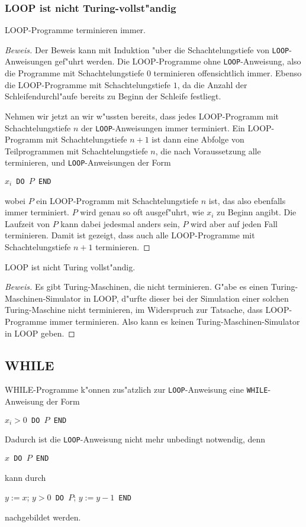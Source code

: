 \subsubsection{LOOP ist nicht Turing-vollst"andig}
\begin{satz}
LOOP-Programme terminieren immer.
\end{satz}

\begin{proof}[Beweis]
Der Beweis kann mit Induktion "uber die Schachtelungstiefe
von {\tt LOOP}-Anweisungen gef"uhrt werden. Die LOOP-Programme
ohne {\tt LOOP}-Anweisung, also die Programme mit Schachtelungstiefe
$0$ terminieren offensichtlich immer. Ebenso die LOOP-Programme
mit Schachtelungstiefe $1$, da die Anzahl der Schleifendurchl"aufe
bereits zu Beginn der Schleife festliegt.

Nehmen wir jetzt an wir w"ussten bereits, dass jedes LOOP-Programm mit
Schachtelungstiefe $n$ der {\tt LOOP}-Anweisungen immer terminiert.
Ein LOOP-Programm mit Schachtelungstiefe $n+1$ ist dann eine
Abfolge von Teilprogrammen mit Schachtelungstiefe $n$, die nach
Voraussetzung alle terminieren, und {\tt LOOP}-Anweisungen der
Form
\begin{algorithmic}
$x_i${\tt\ DO }$P${\tt\ END}
\end{algorithmic}
wobei $P$ ein LOOP-Programm mit Schachtelungstiefe $n$ ist, das also
ebenfalls immer terminiert. $P$ wird genau so oft ausgef"uhrt, wie
$x_i$ zu Beginn angibt. Die Laufzeit von $P$ kann dabei jedesmal
anders sein, $P$ wird aber auf jeden Fall terminieren. Damit ist
gezeigt, dass auch alle LOOP-Programme mit Schachtelungstiefe $n+1$
terminieren.
\end{proof}

\begin{satz}
LOOP ist nicht Turing vollst"andig.
\end{satz}

\begin{proof}[Beweis]
Es gibt Turing-Maschinen, die nicht terminieren. G"abe es einen
Turing-Maschinen-Simulator in LOOP, d"urfte dieser bei der
Simulation einer solchen Turing-Maschine nicht terminieren, im
Widerspruch zur Tatsache, dass LOOP-Programme immer terminieren.
Also kann es keinen Turing-Maschinen-Simulator in LOOP geben.
\end{proof}

\subsection{WHILE}
WHILE-Programme k"onnen zus"atzlich zur {\tt LOOP}-Anweisung
eine {\tt WHILE}-Anweisung der Form
\begin{algorithmic}
$x_i>0${\tt\ DO }$P${\tt\ END}
\end{algorithmic}
Dadurch ist die {\tt LOOP}-Anweisung nicht mehr unbedingt
notwendig, denn
\begin{algorithmic}
$x${\tt\ DO }$P${\tt\ END}
\end{algorithmic}
kann durch
\begin{algorithmic}
\STATE$y:= x$;
$y>0${\tt\ DO }$P$; $y:=y-1${\tt\ END}
\end{algorithmic}
nachgebildet werden.


